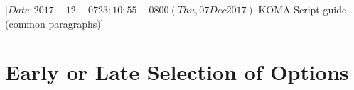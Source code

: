 %
%
%
%
%
%
%
%
% 
%
%
%
%

                 [$Date: 2017-12-07 23:10:55 -0800 (Thu, 07 Dec 2017) $
                  KOMA-Script guide (common paragraphs)]


\section{Early or Late Selection of Options}
\BeginIndexGroup
{}%

